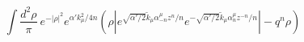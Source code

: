 \begin{equation}
\int \frac{d^2\rho}{\pi}\ e^{-|\rho|^2} e^{\alpha' k_\mu^2/4n}(\rho|
e^{\sqrt{\alpha'/2}\tilde k_\mu \alpha_{-n}^\mu z^n/n}
e^{-\sqrt{\alpha'/2}\tilde k_\mu \alpha_{n}^\mu z^{-n}/n}|-q^n\rho)
\end{equation}

